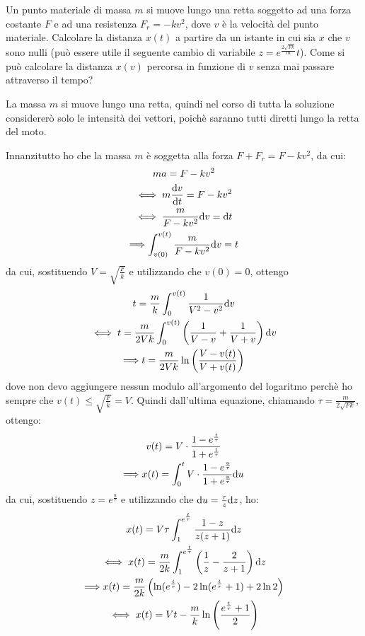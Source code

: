 \documentclass[../main.tex]{subfiles}
\begin{document}
\textex 
Un punto materiale di massa $m$ si muove lungo una retta soggetto ad una forza costante $F$ e ad una resistenza $F_r=-kv^2$, dove $v$ è la velocità del punto materiale.
Calcolare la distanza $x(t)$ a partire da un istante in cui sia $x$ che $v$ sono nulli (può essere utile il seguente cambio di variabile $z=e^{\frac{2\sqrt{Fk}}{m}}t$). 
Come si può calcolare la distanza $x(v)$ percorsa in funzione di $v$ senza mai passare attraverso il tempo?


\solution
La massa $m$ si muove lungo una retta, quindi nel corso di tutta la soluzione considererò solo le intensità dei vettori, poichè saranno tutti diretti lungo la retta del moto.

Innanzitutto ho che la massa $m$ è soggetta alla forza $F+F_r=F-kv^2$, da cui:
\begin{gather*}
	m a=F-kv^2 \\
	\iff m \frac{\mathrm{d} v}{\mathrm{d} t}= F-kv^2 \\
	\iff \frac{m}{F-kv^2}\mathrm{d} v= \mathrm{d} t \\ 
	\Longrightarrow \int_{v(0)}^{v(t)} \frac{m}{F-kv^2}\mathrm{d} v = t
\end{gather*}
da cui, sostituendo $V=\sqrt{\frac{F}{k}}$ e utilizzando che $v(0)=0$, ottengo
\begin{gather*}
	t=\frac{m}{k}\int_{0}^{v(t)} \frac{1}{V^2-v^2}\mathrm{d} v \\
	\iff t=\frac{m}{2Vk}\int_{0}^{v(t)} \left(\frac{1}{V-v}+\frac{1}{V+v}\right)\mathrm{d} v \\
	\Longrightarrow t=\frac{m}{2Vk}\ln{\left(\frac{V-v(t)}{V+v(t)}\right)}
\end{gather*}
dove non devo aggiungere nessun modulo all'argomento del logaritmo perchè ho sempre che $v(t)\le \sqrt{\frac{F}{k}}=V$.
Quindi dall'ultima equazione, chiamando $\tau=\frac{m}{2\sqrt{Fk}}$, ottengo:
\begin{gather*}
	v(t)=V\cdot\frac{1-e^{\frac{t}{\tau}}}{1+e^{\frac{t}{\tau}}}\\
	\Longrightarrow x(t)=\int_{0}^t V\cdot\frac{1-e^{\frac{u}{\tau}}}{1+e^{\frac{u}{\tau}}}\mathrm{d} u
\end{gather*}
da cui, sostituendo $z=e^{\frac{u}{\tau}}$ e utilizzando che $\mathrm{d} u=\frac{\tau}{z}\mathrm{d} z$, ho:
\begin{gather*}
	x(t)=V\tau\int_1^{e^{\frac{t}{\tau}}} \frac{1-z}{z(z+1)}\mathrm{d} z \\
	\iff x(t)=\frac{m}{2k} \int_1^{e^{\frac{t}{\tau}}}\left( \frac{1}{z}- \frac{2}{z+1}\right)\mathrm{d} z \\
	\Longrightarrow x(t)=\frac{m}{2k}\left( \ln(e^{\frac{t}{\tau}}) -2\ln(e^{\frac{t}{\tau}}+1) +2\ln 2\right) \\
	\iff x(t)= Vt - \frac{m}{k} \ln \left( \frac{e^{\frac{t}{\tau}}+1}{2}\right)
\end{gather*}
\end{document}
